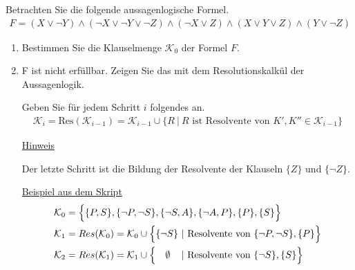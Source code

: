 \documentclass{uebungsblatt}
\begin{document}
\begin{aufgabe}
Betrachten Sie die folgende aussagenlogische Formel.
\begin{align*}
F = 
(X\vee \neg Y) \wedge
(\neg X\vee \neg Y\vee \neg Z) \wedge 
(\neg X\vee Z) \wedge 
(X\vee Y\vee Z) \wedge
(Y\vee \neg Z)
\end{align*}

\begin{enumerate}
\item
Bestimmen Sie die Klauselmenge $\mathcal{K}_0$ der Formel $F$.\\
\item
F ist nicht erfüllbar. Zeigen Sie das mit dem Resolutionskalkül
der Aussagenlogik.

Geben Sie für jedem Schritt $i$ folgendes an.
\begin{align*}
\mathcal{K}_i = \mathrm{Res}(\mathcal{K}_{i-1}) = \mathcal{K}_{i-1} \cup \{R\ |\ R \mbox{ ist Resolvente von } K', K'' \in \mathcal{K}_{i-1} \} 
\end{align*}

\underline{Hinweis}

Der letzte Schritt ist die Bildung der Resolvente der
Klauseln $\{Z\}$ und $\{\neg Z\}$. 

\smallskip
\underline{Beispiel aus dem Skript}
\begin{align*}
\mathcal{K}_0 &= \Bigl\{\{P, S\},\{\neg P, \neg S\},\{\neg S, A\},\{\neg A, P\},\{P\},\{S\}\Bigr\} \\
\mathcal{K}_1 &= Res(\mathcal{K}_0) = \mathcal{K}_0 \cup \Bigl\{ \{\neg S\}\ | 
\mbox{ Resolvente von } \{\neg P, \neg S\}, \{P\} \Bigr\} \\
\mathcal{K}_2 &= Res(\mathcal{K}_1) = \mathcal{K}_1 \cup \Bigl\{ \quad \emptyset\quad\, | 
\mbox{ Resolvente von } \{\neg S\}, \{S\} \Bigr\} 
\end{align*}


\end{enumerate}

\end{aufgabe}
\begin{loesung}

\end{loesung}
\newpage
\end{document}
